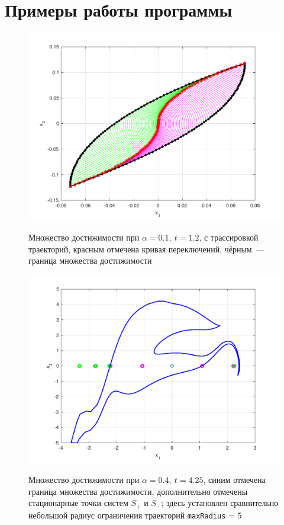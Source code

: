 \documentclass[11pt, oneside, final]{article}
\theoremstyle{break}
\numberwithin{equation}{section}
\theoremstyle{plain}
\theoremstyle{definition}
\begin{document}
    \section{Примеры работы программы}
    \label{sec:examples}
    \begin{figure}[!htpb]
            \centering
            \includegraphics[width=\linewidth]{figa01t12}
            \label{pic:1}
            \caption{Множество достижимости при \(\alpha = 0.1,\: t = 1.2\), с трассировкой траекторий, красным отмечена кривая переключений, чёрным~--- граница множества достижимости}
    \end{figure}
    \begin{figure}[!htpb]
            \centering
            \includegraphics[width=\linewidth]{figa05t45}
            \label{pic:2}
            \caption{Множество достижимости при \(\alpha = 0.4,\: t = 4.25\), синим отмечена граница множества достижимости, дополнительно отмечены стационарные точки систем \(S_+\) и \(S_-\); здесь установлен сравнительно небольшой радиус ограничения траекторий \texttt{maxRadius} = 5}
    \end{figure}
\end{document}
